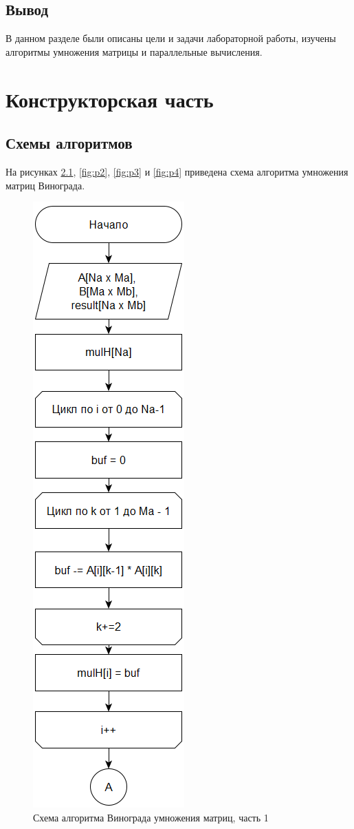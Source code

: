 \documentclass[12pt]{report}
\begin{document}
\section{Вывод}
	В данном разделе были описаны цели и задачи лабораторной работы, изучены алгоритмы умножения матрицы и параллельные вычисления.
	
\clearpage

\chapter{Конструкторская часть}

\section{Схемы алгоритмов}
На рисунках \ref{fig:p1}, \ref{fig:p2}, \ref{fig:p3} и \ref{fig:p4} приведена схема алгоритма умножения матриц Винограда.

\begin{figure}[h]
	\centering
	\includegraphics[width=0.21\linewidth]{p1.png}
	\caption{Схема алгоритма Винограда умножения матриц, часть 1}
	\label{fig:p1}
\end{figure}

\newpage
\end{document}
